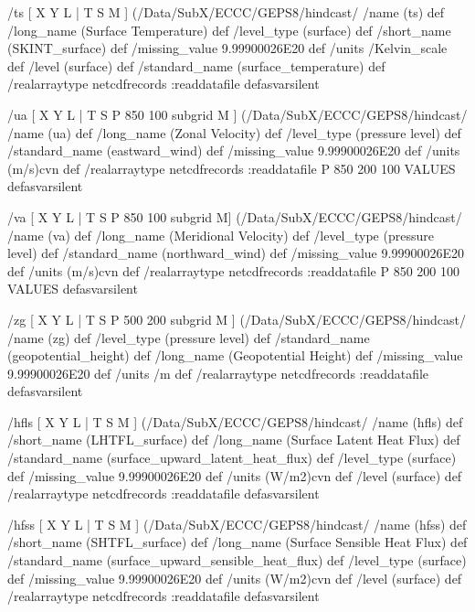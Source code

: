 \begin{ingrid}
/ts{
[ X Y L | T S M ] (/Data/SubX/ECCC/GEPS8/hindcast/%
/name (ts) def
 /long_name (Surface Temperature) def
 /level_type (surface) def
 /short_name (SKINT_surface) def
 /missing_value 9.99900026E20 def
 /units /Kelvin_scale def
 /level (surface) def
 /standard_name (surface_temperature) def
 /realarraytype netcdfrecords :readdatafile
}defasvarsilent

 /ua{
[ X Y L | T S P 850 100 subgrid M ] (/Data/SubX/ECCC/GEPS8/hindcast/%
/name (ua) def
 /long_name (Zonal Velocity) def 
 /level_type (pressure level) def
 /standard_name (eastward_wind) def
 /missing_value 9.99900026E20 def
 /units (m/s)cvn def
 /realarraytype netcdfrecords :readdatafile
 P 850 200 100 VALUES
}defasvarsilent

 /va{
[ X Y L | T S P 850 100 subgrid M] (/Data/SubX/ECCC/GEPS8/hindcast/%
/name (va) def
 /long_name (Meridional Velocity) def 
 /level_type (pressure level) def
 /standard_name (northward_wind) def
 /missing_value 9.99900026E20 def
 /units (m/s)cvn def
 /realarraytype netcdfrecords :readdatafile
 P 850 200 100 VALUES
}defasvarsilent

 /zg{
[ X Y L | T S P 500 200 subgrid M ] (/Data/SubX/ECCC/GEPS8/hindcast/%
/name (zg) def
 /level_type (pressure level) def
 /standard_name (geopotential_height) def
 /long_name (Geopotential Height) def
 /missing_value 9.99900026E20 def
 /units /m def
 /realarraytype netcdfrecords :readdatafile
}defasvarsilent

 /hfls{
[ X Y L | T S M ] (/Data/SubX/ECCC/GEPS8/hindcast/%
/name (hfls) def
 /short_name (LHTFL_surface) def
 /long_name (Surface Latent Heat Flux) def
 /standard_name (surface_upward_latent_heat_flux) def
 /level_type (surface) def
 /missing_value 9.99900026E20 def
 /units (W/m2)cvn def
 /level (surface) def
 /realarraytype netcdfrecords :readdatafile
}defasvarsilent

 /hfss{
[ X Y L | T S M ] (/Data/SubX/ECCC/GEPS8/hindcast/%
/name (hfss) def
 /short_name (SHTFL_surface) def
 /long_name (Surface Sensible Heat Flux) def
 /standard_name (surface_upward_sensible_heat_flux) def
 /level_type (surface) def
 /missing_value 9.99900026E20 def
 /units (W/m2)cvn def
 /level (surface) def
 /realarraytype netcdfrecords :readdatafile
}defasvarsilent


\end{ingrid}
